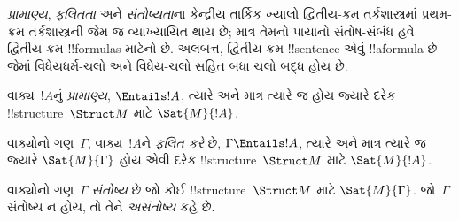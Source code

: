 \documentclass[../../../include/open-logic-section]{subfiles}
\begin{document}

\begin{explain}
\emph{પ્રામાણ્ય}, \emph{ફલિતતા} અને \emph{સંતોષ્યતા}ના કેન્દ્રીય
તાર્કિક ખ્યાલો દ્વિતીય-ક્રમ તર્કશાસ્ત્રમાં પ્રથમ-ક્રમ તર્કશાસ્ત્રની
જેમ જ વ્યાખ્યાયિત થાય છે; માત્ર તેમનો પાયાનો સંતોષ-સંબંધ હવે
દ્વિતીય-ક્રમ !!{formula}s માટેનો છે. અલબત્ત, દ્વિતીય-ક્રમ
!!{sentence} એવું !!a{formula} છે જેમાં વિધેયધર્મ-ચલો અને
વિધેય-ચલો સહિત બધા ચલો બદ્ધ હોય છે.
\end{explain}

\begin{defn}[પ્રામાણ્ય]
વાક્ય~$!A$નું \emph{પ્રામાણ્ય}, $\Entails !A$, ત્યારે અને માત્ર ત્યારે જ
હોય જ્યારે દરેક !!{structure}~$\Struct M$ માટે $\Sat{M}{!A}$.
\end{defn}

\begin{defn}[ફલિતતા]
વાક્યોનો ગણ~$\Gamma$, વાક્ય~$!A$ને \emph{ફલિત કરે} છે,
$\Gamma \Entails !A$, ત્યારે અને માત્ર ત્યારે જ જ્યારે
$\Sat{M}{\Gamma}$ હોય એવી દરેક !!{structure}~$\Struct M$ માટે
$\Sat{M}{!A}$.
\end{defn}

\begin{defn}[સંતોષ્યતા]
વાક્યોનો ગણ~$\Gamma$ \emph{સંતોષ્ય} છે જો કોઈ !!{structure}~$\Struct M$
માટે $\Sat{M}{\Gamma}$. જો~$\Gamma$ સંતોષ્ય ન હોય, તો તેને
\emph{અસંતોષ્ય} કહે છે.
\end{defn}
\end{document}
